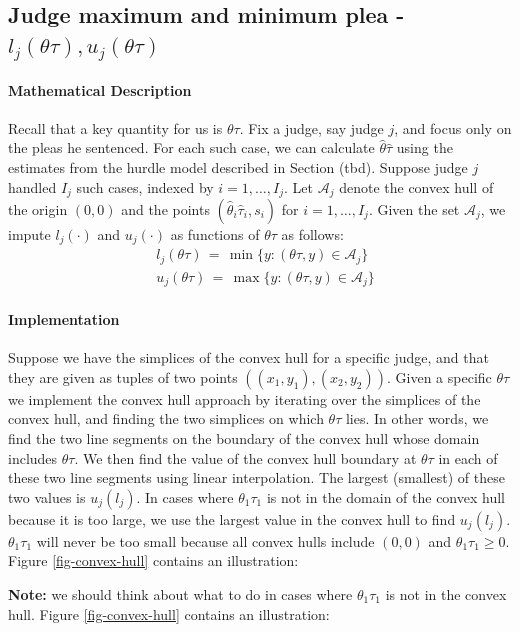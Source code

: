 \documentclass[11pt]{article}
\theoremstyle{ModifiedStyle}
\begin{document}
  \subsection{Judge maximum and minimum plea - $l_j(\theta \tau),u_j(\theta \tau)$}\label{convex_hull-estimation}
    \paragraph{Mathematical Description} Recall that a key quantity for us is $\theta\tau$. Fix a judge, say judge $j$, and focus only on the pleas he sentenced. For each such case, we can calculate $\hat{\theta}\hat{\tau}$ using the estimates from the hurdle model described in Section (tbd). Suppose judge $j$ handled $I_j$ such cases, indexed by $i=1,\ldots,I_j$. Let $\mathcal{A}_j$ denote the convex hull of the origin $(0,0)$ and the points $(\hat{\theta}_i\hat{\tau}_i,s_i)$ for $i=1,\ldots,I_j$. Given the set $\mathcal{A}_j$, we impute $l_j(\cdot)$ and $u_j(\cdot)$ as functions of $\theta\tau$ as follows:
		\begin{align*}
			&l_j(\theta\tau) \,=\, \min\{y:(\theta\tau,y)\in\mathcal{A}_j \} \\
			&u_j(\theta\tau) \,=\, \max\{y:(\theta\tau,y)\in\mathcal{A}_j \}
		\end{align*}

   \paragraph{Implementation}
   Suppose we have the simplices of the convex hull for a specific judge, and that they are given as tuples of two points $((x_1,y_1),(x_2,y_2))$. Given a specific $\theta \tau$ we implement the convex hull approach by iterating over the simplices of the convex hull, and finding the two simplices on which $\theta \tau$ lies. In other words, we find the two line segments on the boundary of the convex hull whose domain includes $\theta \tau$. We then find the value of the convex hull boundary at $\theta \tau$ in each of these two line segments using linear interpolation. The largest (smallest) of these two values is $u_j (l_j)$. In cases where $\theta_1 \tau_1$ is not in the domain of the convex hull because it is too large, we use the largest value in the convex hull to find $u_j (l_j)$. $\theta_1 \tau_1$ will never be too small because all convex hulls include $(0,0)$ and $\theta_1 \tau_1 \geq 0$. Figure \ref{fig-convex-hull} contains an illustration:

	 \textbf{Note:} we should think about what to do in cases where $\theta_1 \tau_1$ is not in the convex hull. Figure \ref{fig-convex-hull} contains an illustration:
\end{document}
